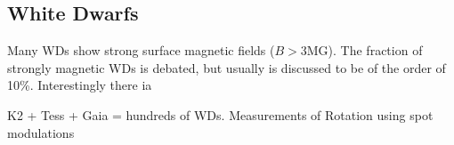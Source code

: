 {\color{red} \subsection{White Dwarfs}}
Many WDs show strong surface magnetic fields ($B>$3MG). The fraction of strongly magnetic WDs is debated, but usually is discussed to be of the order of 10\%. Interestingly there ia  

K2 + Tess + Gaia = hundreds of WDs. Measurements of Rotation using spot modulations